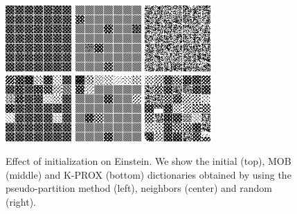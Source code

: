 \documentclass[twocolumn]{IEEEtran}
\theoremstyle{definition}
\begin{document}
\begin{figure}[tp]
\centering\includegraphics[height=1.0in]{fig/einstein_init_part0.png} %
\includegraphics[height=1.0in]{fig/einstein_init_neigh0.png} %
\includegraphics[height=1.0in]{fig/einstein_init_rand0.png}\\[1ex]%
\includegraphics[height=1.0in]{fig/einstein_init_part1.png} %
\includegraphics[height=1.0in]{fig/einstein_init_neigh1.png} %
\includegraphics[height=1.0in]{fig/einstein_init_rand1.png}%
\caption{\label{fig:init-einstein} Effect of initialization on Einstein. We show the initial (top), MOB (middle) and K-PROX (bottom) dictionaries obtained by using the pseudo-partition method (left), neighbors (center) and random (right).}
\end{figure}
\end{document}
